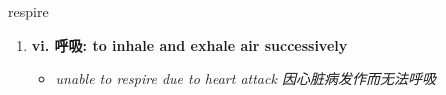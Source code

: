 
\begin{frame}
{\huge respire}
\begin{center}
\begin{enumerate}\Large
  \item \textbf{vi. 呼吸: to inhale and exhale air successively}
  \begin{itemize}
    \item \em{\Large{unable to respire due to heart attack 因心脏病发作而无法呼吸}}
  \end{itemize}
\end{enumerate}
\end{center}
\end{frame}
